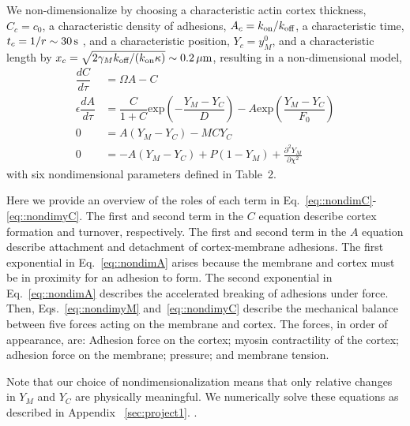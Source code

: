 We non-dimensionalize by choosing a characteristic actin cortex thickness, $C_c= c_0$, a characteristic density of adhesions, $A_c =  k_{\mbox{\scriptsize on}}/k_{\mbox{\scriptsize off}}$, a characteristic time, $t_c=1/r \sim 30\,\mbox{s}$ \cite{Fritzsche:2014jw}, and a characteristic position, $Y_c=y_M^0$, and a characteristic length by $x_c =\sqrt{2 \gamma_M k_{\mbox{\scriptsize off}}/(k_{\mbox{\scriptsize on}} \kappa)} \sim 0.2\,\mu\mbox{m}$, resulting in a non-dimensional model, 
\begin{align}
\dfrac{dC}{d \tau}  & =  \Omega A - C\label{eq::nondimC}\\
\epsilon\dfrac{dA}{ d \tau}  & =  \dfrac{C}{1+C} \mbox{exp}\left(-\dfrac{Y_M-Y_C}{D}\right) - A \mbox{exp} \left(\dfrac{Y_M-Y_C}{F_0} \right) \label{eq::nondimA}\\
0 & = A(Y_M-Y_C) - MCY_C \label{eq::nondimyM}\\
0 & = -A(Y_M-Y_C) + P(1-Y_M) +  \frac{\partial^2 Y_M}{\partial \chi^2} \label{eq::nondimyC}
\end{align}
with six nondimensional parameters defined in Table~2. 

Here we provide an overview of the roles of each term in Eq.~\ref{eq::nondimC}-\ref{eq::nondimyC}. The first and second term in the $C$ equation describe cortex formation and turnover, respectively. The first and second term in the $A$ equation describe attachment and detachment of cortex-membrane adhesions. The first exponential in Eq.~\ref{eq::nondimA} arises because the membrane and cortex must be in proximity for an adhesion to form. The second exponential in Eq.~\ref{eq::nondimA} describes the accelerated breaking of adhesions under force. Then, Eqs.~\ref{eq::nondimyM} and~\ref{eq::nondimyC} describe the mechanical balance between five forces acting on the membrane and cortex. The forces, in order of appearance, are: Adhesion force on the cortex; myosin contractility of the cortex; adhesion force on the membrane; pressure; and membrane tension.

Note that our choice of nondimensionalization means that only relative changes in $Y_M$ and $Y_C$ are physically meaningful. We numerically solve these equations as described in Appendix ~\ref{sec:project1}. \cite{wise07}. 





